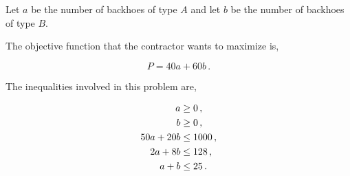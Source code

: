 %
%
\usetikzlibrary{patterns}

\begin{subquestions}


\subquestion

Let $a$ be the number of backhoes of type $A$ and let $b$ be the number of backhoes of type $B$.

\begin{subsubquestions}
	

\subsubquestion

The objective function that the contractor wants to maximize is,

\begin{equation}
	P = 40a + 60b \,.
\end{equation}


\subsubquestion

The inequalities involved in this problem are,

\begin{align}
	a & \geq 0 \,, \nonumber \\
	b & \geq 0 \,, \nonumber \\
	50a + 20b & \leq 1000 \,, \nonumber \\
	2a + 8b & \leq 128\,, \nonumber \\
	a + b & \leq 25\,.
\end{align}


\end{subsubquestions}
\end{subquestions}
